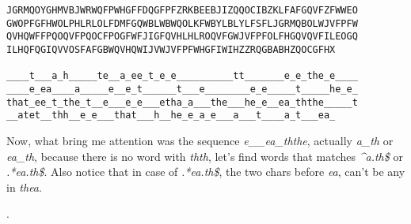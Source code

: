 \noindent
\begin{Verbatim}[frame=single]
JGRMQOYGHMVBJWRWQFPWHGFFDQGFPFZRKBEEBJIZQQOCIBZKLFAFGQVFZFWWEO
GWOPFGFHWOLPHLRLOLFDMFGQWBLWBWQOLKFWBYLBLYLFSFLJGRMQBOLWJVFPFW
QVHQWFFPQOQVFPQOCFPOGFWFJIGFQVHLHLROQVFGWJVFPFOLFHGQVQVFILEOGQ
ILHQFQGIQVVOSFAFGBWQVHQWIJVWJVFPFWHGFIWIHZZRQGBABHZQOCGFHX

____t___a_h_____te__a_ee_t_e_e__________tt_______e_e_the_e____
____e_ea____a_____e__e_t______t___e________e_e_____t_____he_e_
that_ee_t_the_t__e___e_e___etha_a___the___he_e__ea_ththe_____t
__atet__thh__e_e___that___h__he_e_a_e___a___t____a_t___ea_
\end{Verbatim}

\vspace{1em}

Now, what bring me attention was the sequence \textit{e\_\_ea\_ththe}, actually \textit{a\_th} or \textit{ea\_th}, because there is no word with \textit{thth}, let's find words that matches \textit{\textasciicircum{}a.th\$} or \textit{.*ea.th\$}. Also notice that in case of \textit{.*ea.th\$}, the two chars before \textit{ea}, can't be any in \textit{thea}.

\begin{center}
	 .
\end{center}

